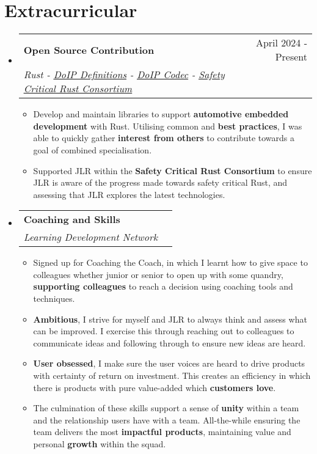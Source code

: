 \documentclass[letterpaper,11pt]{article}
\makeatletter
\newcommand{\resumeItem}[1]{
  \item\small{
    {#1 \vspace{-2pt}}
  }
}
\newcommand{\resumeSubheading}[4]{
  \vspace{-2pt}\item
    \begin{tabular*}{0.97\textwidth}[t]{l@{\extracolsep{\fill}}r}
      \textbf{#1} & #2 \\
      \textit{\small#3} & \textit{\small #4} \\
    \end{tabular*}\vspace{-7pt}
}
\newcommand{\resumeSubHeadingListStart}{\begin{itemize}[leftmargin=0.15in, label={}]}
\newcommand{\resumeSubHeadingListEnd}{\end{itemize}}
\newcommand{\resumeItemListStart}{\begin{itemize}}
\newcommand{\resumeItemListEnd}{\end{itemize}\vspace{-5pt}}
\makeatother
\begin{document}
\section{Extracurricular}
  \resumeSubHeadingListStart
    \resumeSubheading
      {Open Source Contribution}{April 2024 - Present}
      {Rust - \href{https://crates.io/crates/doip-definitions}{\underline{DoIP Definitions}} - \href{https://crates.io/crates/doip-codec}{\underline{DoIP Codec}} - \href{https://github.com/rustfoundation/safety-critical-rust-consortium}{\underline{Safety Critical Rust Consortium}}}{}
      \resumeItemListStart
      \resumeItem{Develop and maintain libraries to support \textbf{automotive embedded development} with Rust. Utilising common and \textbf{best practices}, I was able to quickly gather \textbf{interest from others} to contribute towards a goal of combined specialisation.}
      \resumeItem{Supported JLR within the \textbf{Safety Critical Rust Consortium} to ensure JLR is aware of the progress made towards safety critical Rust, and assessing that JLR explores the latest technologies.}
      \resumeItemListEnd

    \resumeSubheading
      {Coaching and Skills}{}
      {Learning Development Network}{}
      \resumeItemListStart
      \resumeItem{Signed up for Coaching the Coach, in which I learnt how to give space to colleagues whether junior or senior to open up with some quandry, \textbf{supporting colleagues} to reach a decision using coaching tools and techniques.}
      \resumeItem{\textbf{Ambitious}, I strive for myself and JLR to always think and assess what can be improved. I exercise this through reaching out to colleagues to communicate ideas and following through to ensure new ideas are heard.}
      \resumeItem{\textbf{User obsessed}, I make sure the user voices are heard to drive products with certainty of return on investment. This creates an efficiency in which there is products with pure value-added which \textbf{customers love}.}
      \resumeItem{The culmination of these skills support a sense of  \textbf{unity} within a team and the relationship users have with a team. All-the-while ensuring the team delivers the most  \textbf{impactful products}, maintaining value and personal \textbf{growth} within the squad.}
      \resumeItemListEnd
  \resumeSubHeadingListEnd
\end{document}
